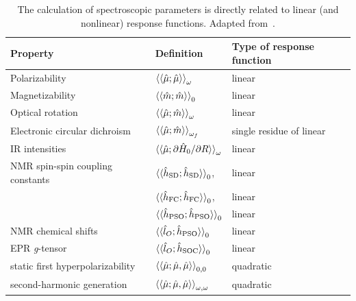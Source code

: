 \documentclass[%
class = book,%
crop = false,%
float = true,%
multi = true,%
preview = false,%
]{standalone}
\begin{document}
\begin{table}
  \centering
  \caption{The calculation of spectroscopic parameters is directly related to linear (and nonlinear) response functions. Adapted from~\parencite{TODO}.}
  \begin{tabular}{lll}
    \toprule
    \textbf{Property}                 & \textbf{Definition}                                                                    & \textbf{Type of response function} \\
    \midrule
    Polarizability                    & \( \braket{\braket{\hat{\mu};\hat{\mu}}}_{\omega} \)                                   & linear \\
    Magnetizability                   & \( \braket{\braket{\hat{m};\hat{m}}}_{0} \)                                            & linear \\
    Optical rotation                  & \( \braket{\braket{\hat{\mu};\hat{m}}}_{\omega} \)                                     & linear \\
    Electronic circular dichroism     & \( \braket{\braket{\hat{\mu};\hat{m}}}_{\omega_{f}} \)                                 & single residue of linear \\
    IR intensities                    & \( \braket{\braket{\hat{\mu};\partial\hat{H}_{0}/\partial R}}_{\omega} \)              & linear \\
    NMR spin-spin coupling constants  & \( \braket{\braket{\hat{h}_{\text{SD}};\hat{h}_{\text{SD}}}}_{0} \),                   & linear \\
                                      & \( \braket{\braket{\hat{h}_{\text{FC}};\hat{h}_{\text{FC}}}}_{0} \),                   & linear \\
                                      & \( \braket{\braket{\hat{h}_{\text{PSO}};\hat{h}_{\text{PSO}}}}_{0} \)                  & linear \\
    NMR chemical shifts               & \( \braket{\braket{\hat{l}_{O};\hat{h}_{\text{PSO}}}}_{0} \)                           & linear \\
    EPR \textit{g}-tensor             & \( \braket{\braket{\hat{l}_{O};\hat{h}_{\text{SOC}}}}_{0} \)                           & linear \\
    \midrule
    static first hyperpolarizability  & \( \braket{\braket{\hat{\mu};\hat{\mu},\hat{\mu}}}_{0,0} \)                            & quadratic \\
    second-harmonic generation        & \( \braket{\braket{\hat{\mu};\hat{\mu},\hat{\mu}}}_{\omega,\omega} \)                  & quadratic \\

\end{tabular}
\end{table}
\end{document}
